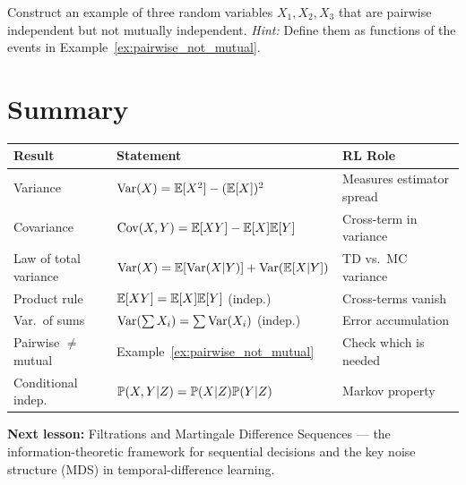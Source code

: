 \documentclass[11pt,a4paper]{article}
\begin{document}
\begin{exercise}
\label{ex:pairwise_mutual}
Construct an example of three random variables
$X_1, X_2, X_3$ that are pairwise independent but not mutually
independent.
\textit{Hint:} Define them as functions of the events in
Example~\ref{ex:pairwise_not_mutual}.
\end{exercise}


\section{Summary}
\label{sec:summary}

\begin{center}
\renewcommand{\arraystretch}{1.4}
\begin{tabular}{p{4cm} p{5.5cm} p{4.5cm}}
\toprule
\textbf{Result} & \textbf{Statement} & \textbf{RL Role} \\
\midrule
Variance &
  $\operatorname{Var}(X) = \mathbb{E}[X^2] - (\mathbb{E}[X])^2$ &
  Measures estimator spread \\
Covariance &
  $\operatorname{Cov}(X,Y) = \mathbb{E}[XY] - \mathbb{E}[X]\mathbb{E}[Y]$ &
  Cross-term in variance \\
Law of total variance &
  $\operatorname{Var}(X) = \mathbb{E}[\operatorname{Var}(X|Y)] + \operatorname{Var}(\mathbb{E}[X|Y])$ &
  TD vs.\ MC variance \\
Product rule &
  $\mathbb{E}[XY] = \mathbb{E}[X]\mathbb{E}[Y]$ (indep.) &
  Cross-terms vanish \\
Var.\ of sums &
  $\operatorname{Var}(\sum X_i) = \sum \operatorname{Var}(X_i)$ (indep.) &
  Error accumulation \\
Pairwise $\neq$ mutual &
  Example~\ref{ex:pairwise_not_mutual} &
  Check which is needed \\
Conditional indep.\ &
  $\mathbb{P}(X,Y|Z) = \mathbb{P}(X|Z)\mathbb{P}(Y|Z)$ &
  Markov property \\
\bottomrule
\end{tabular}
\end{center}

\medskip
\noindent\textbf{Next lesson:} Filtrations and Martingale
Difference Sequences --- the information-theoretic framework for
sequential decisions and the key noise structure (MDS) in
temporal-difference learning.


\end{document}
